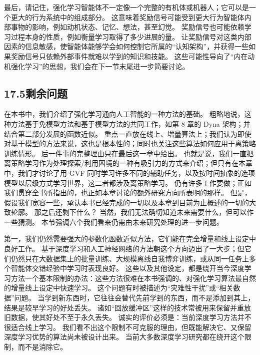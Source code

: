 \documentclass[UTF8,12pt,a4paper,fontset=fandol]{ctexart}
\begin{document}
最后，请记住，强化学习智能体不一定像一个完整的有机体或机器人；它可以是一个更大的行为系统中的组成部分。
这意味着奖励信号可能受到更大行为智能体内部事物的影响，例如动机状态、记忆、想法，甚至幻觉。
奖励信号也可能依赖学习过程本身的性质，例如衡量学习取得了多少进展的量。
让奖励信号对这类内部因素的信息敏感，使智能体能够学会如何控制它所属的“认知架构”，并获得一些如果奖励信号只依赖外部事件就难以学到的知识和技能。
这些可能性导向了“内在动机强化学习”的思想，我们会在下一节末尾进一步简要讨论。

\subsection*{17.5\quad 剩余问题}

在本书中，我们介绍了强化学习通向人工智能的一种方法的基础。
粗略地说，这种方法基于免模型方法和基于模型方法的共同工作，如第 8 章的 Dyna 架构；并结合第二部分发展的函数近似。
重点一直放在线上、增量算法上；我们认为即使对基于模型的方法来说，这也是根本性的；同时也关注这些算法如何应用于离策略训练情形。
后一件事的完整理由只在最后这一章中给出。
也就是说，我们一直把离策略学习作为处理探索/利用困境的一种有吸引力的方式来介绍；但只有在本章中，我们才讨论了用 GVF 同时学习许多不同的辅助任务，以及按时间抽象的选项模型以层级方式学习世界，这二者都涉及离策略学习。
仍有许多工作要做；正如我们贯穿全书所指出的，也正如本章讨论的额外研究方向所表明的那样。
但是，假设我们宽容一些，承认本书已经完成的一切以及本章到目前为止概述的一切的大致轮廓。
那之后还剩下什么？
当然，我们无法确切知道未来需要什么，但可以作一些猜测。
本节强调六个我们看来仍需由未来研究处理的进一步问题。

第一，我们仍然需要强大的参数化函数近似方法，它们能在完全增量和线上设定中良好工作。
基于深度学习和人工神经网络的方法朝这个方向迈出了一大步；但它们仍然只在大数据集上的批量训练、大规模离线自我博弈训练，或从同一任务上多个智能体交错经验中学习时表现良好。
这些以及其他设定，都是绕开当今深度学习方法一个基本限制的办法：这些方法很难在本书强调的、对强化学习算法最自然的增量线上设定中快速学习。
这个问题有时被描述为“灾难性干扰”或“相关数据”问题。
当学到新东西时，它往往会替代先前学到的东西，而不是添加到其上，结果是较早学习的好处丢失。
诸如“回放缓冲区”这样的技术常被用来保留并重放旧数据，使其好处不至于永久丢失。
诚实的评价必须是：当前深度学习方法并不很适合线上学习。
我们看不出这个限制不可克服的理由，但既能解决它、又保留深度学习优势的算法尚未被设计出来。
当前大多数深度学习研究都在绕开这个限制，而不是消除它。
\end{document}
